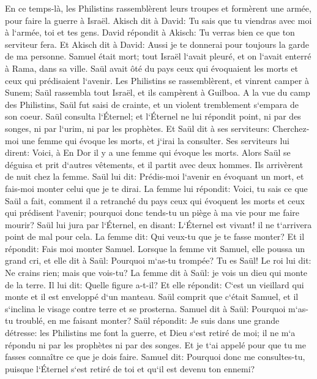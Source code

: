 \verse En ce temps-là, les Philistins rassemblèrent leurs troupes et formèrent une armée, pour faire la guerre à Israël. Akisch dit à David: Tu sais que tu viendras avec moi à l`armée, toi et tes gens. 
\verse David répondit à Akisch: Tu verras bien ce que ton serviteur fera. Et Akisch dit à David: Aussi je te donnerai pour toujours la garde de ma personne. 
\verse Samuel était mort; tout Israël l`avait pleuré, et on l`avait enterré à Rama, dans sa ville. Saül avait ôté du pays ceux qui évoquaient les morts et ceux qui prédisaient l`avenir. 
\verse Les Philistins se rassemblèrent, et vinrent camper à Sunem; Saül rassembla tout Israël, et ils campèrent à Guilboa. 
\verse A la vue du camp des Philistins, Saül fut saisi de crainte, et un violent tremblement s`empara de son coeur. 
\verse Saül consulta l`Éternel; et l`Éternel ne lui répondit point, ni par des songes, ni par l`urim, ni par les prophètes. 
\verse Et Saül dit à ses serviteurs: Cherchez-moi une femme qui évoque les morts, et j`irai la consulter. Ses serviteurs lui dirent: Voici, à En Dor il y a une femme qui évoque les morts. 
\verse Alors Saül se déguisa et prit d`autres vêtements, et il partit avec deux hommes. Ils arrivèrent de nuit chez la femme. Saül lui dit: Prédis-moi l`avenir en évoquant un mort, et fais-moi monter celui que je te dirai. 
\verse La femme lui répondit: Voici, tu sais ce que Saül a fait, comment il a retranché du pays ceux qui évoquent les morts et ceux qui prédisent l`avenir; pourquoi donc tends-tu un piège à ma vie pour me faire mourir? 
\verse Saül lui jura par l`Éternel, en disant: L`Éternel est vivant! il ne t`arrivera point de mal pour cela. 
\verse La femme dit: Qui veux-tu que je te fasse monter? Et il répondit: Fais moi monter Samuel. 
\verse Lorsque la femme vit Samuel, elle poussa un grand cri, et elle dit à Saül: Pourquoi m`as-tu trompée? Tu es Saül! 
\verse Le roi lui dit: Ne crains rien; mais que vois-tu? La femme dit à Saül: je vois un dieu qui monte de la terre. 
\verse Il lui dit: Quelle figure a-t-il? Et elle répondit: C`est un vieillard qui monte et il est enveloppé d`un manteau. Saül comprit que c`était Samuel, et il s`inclina le visage contre terre et se prosterna. 
\verse Samuel dit à Saül: Pourquoi m`as-tu troublé, en me faisant monter? Saül répondit: Je suis dans une grande détresse: les Philistins me font la guerre, et Dieu s`est retiré de moi; il ne m`a répondu ni par les prophètes ni par des songes. Et je t`ai appelé pour que tu me fasses connaître ce que je dois faire. 
\verse Samuel dit: Pourquoi donc me consultes-tu, puisque l`Éternel s`est retiré de toi et qu`il est devenu ton ennemi? 
